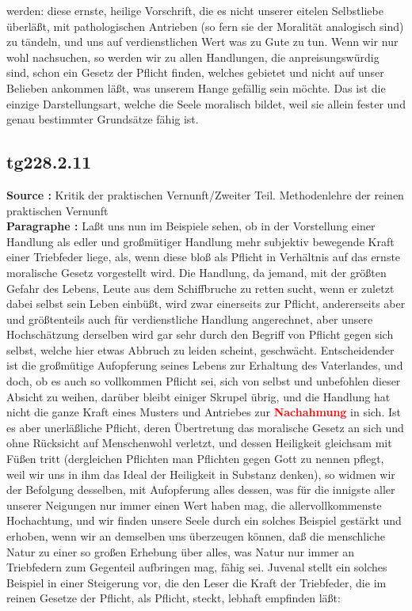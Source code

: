 \documentclass[a4paper,12pt,twoside]{book}
\newcommand{\match}[1]{\textcolor{red}{\textbf{#1}}}
\begin{document}
werden: diese ernste, heilige Vorschrift, die es nicht unserer eitelen Selbstliebe überläßt, mit pathologischen Antrieben (so fern sie der Moralität analogisch sind) zu tändeln, und uns auf verdienstlichen Wert was zu Gute zu tun. Wenn wir nur wohl nachsuchen, so werden wir zu allen Handlungen, die anpreisungswürdig sind, schon ein Gesetz der Pflicht finden, welches gebietet und nicht auf unser Belieben ankommen läßt, was unserem Hange gefällig sein möchte. Das ist die einzige Darstellungsart, welche die Seele moralisch bildet, weil sie allein fester und genau bestimmter Grundsätze fähig ist. 
	
	\subsection*{tg228.2.11} 
	\textbf{Source : }Kritik der praktischen Vernunft/Zweiter Teil. Methodenlehre der reinen praktischen Vernunft\\  
	
	\noindent\textbf{Paragraphe : }Laßt uns nun im Beispiele sehen, ob in der Vorstellung einer Handlung als edler und großmütiger Handlung mehr subjektiv bewegende Kraft einer Triebfeder liege, als, wenn diese bloß als Pflicht in Verhältnis auf das ernste moralische Gesetz vorgestellt wird. Die Handlung, da jemand, mit der größten Gefahr des Lebens, Leute aus dem Schiffbruche zu retten sucht, wenn er zuletzt dabei selbst sein Leben einbüßt, wird zwar einerseits zur Pflicht, andererseits aber und größtenteils auch für verdienstliche Handlung angerechnet, aber unsere Hochschätzung derselben wird gar sehr durch den Begriff von Pflicht gegen sich selbst, welche hier etwas Abbruch zu leiden scheint, geschwächt. Entscheidender ist die großmütige Aufopferung seines Lebens zur Erhaltung des Vaterlandes, und doch, ob es auch so vollkommen Pflicht sei, sich von selbst und unbefohlen dieser Absicht zu weihen, darüber bleibt einiger Skrupel übrig, und die Handlung hat nicht die ganze Kraft eines Musters und Antriebes zur \match{Nachahmung} in sich. Ist es aber unerläßliche Pflicht, deren Übertretung das moralische Gesetz an sich und ohne Rücksicht auf Menschenwohl verletzt, und dessen Heiligkeit gleichsam mit Füßen tritt (dergleichen Pflichten man Pflichten gegen Gott zu nennen pflegt, weil wir uns in ihm das Ideal der Heiligkeit in Substanz denken), so widmen  wir der Befolgung desselben, mit Aufopferung alles dessen, was für die innigste aller unserer Neigungen nur immer einen Wert haben mag, die allervollkommenste Hochachtung, und wir finden unsere Seele durch ein solches Beispiel gestärkt und erhoben, wenn wir an demselben uns überzeugen können, daß die menschliche Natur zu einer so großen Erhebung über alles, was Natur nur immer an Triebfedern zum Gegenteil aufbringen mag, fähig sei. Juvenal stellt ein solches Beispiel in einer Steigerung vor, die den Leser die Kraft der Triebfeder, die im reinen Gesetze der Pflicht, als Pflicht, steckt, lebhaft empfinden läßt: 
	
\end{document}
